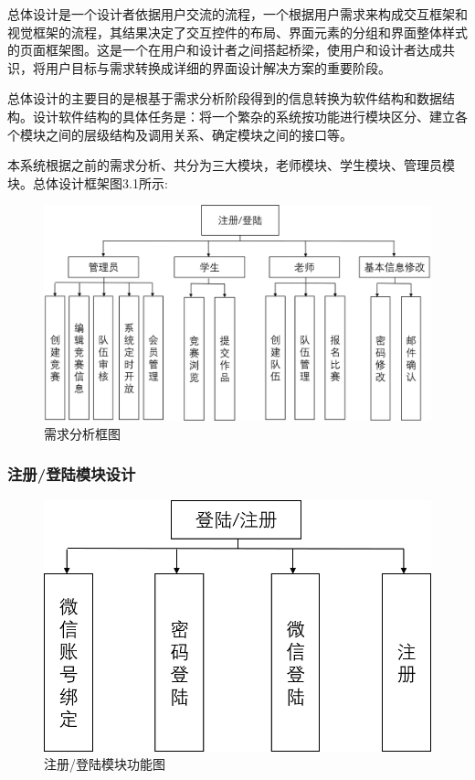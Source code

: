 \documentclass[a4paper]{ltxdoc}
\begin{document}
{		总体设计是一个设计者依据用户交流的流程，一个根据用户需求来构成交互框架和视觉框架的流程，其结果决定了交互控件的布局、界面元素的分组和界面整体样式的页面框架图。这是一个在用户和设计者之间搭起桥梁，使用户和设计者达成共识，将用户目标与需求转换成详细的界面设计解决方案的重要阶段。
		
		总体设计的主要目的是根基于需求分析阶段得到的信息转换为软件结构和数据结构。设计软件结构的具体任务是：将一个繁杂的系统按功能进行模块区分、建立各个模块之间的层级结构及调用关系、确定模块之间的接口等。
		
		本系统根据之前的需求分析、共分为三大模块，老师模块、学生模块、管理员模块。总体设计框架图3.1所示:
		
		\begin{figure}[!htb]
			\centering
			\includegraphics[width=0.95\linewidth]{images/1.png}
			\caption{需求分析框图}
		\end{figure}
	
		\subsubsection{注册/登陆模块设计}
		\begin{figure}[H]
			\centering
			\includegraphics[width=0.7\linewidth]{images/1-4.png}
			\caption{注册/登陆模块功能图}
		\end{figure}
		
}
\end{document}
